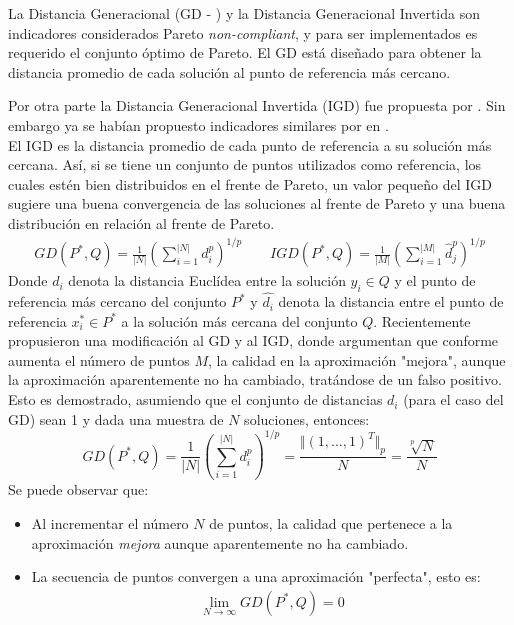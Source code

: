 La Distancia Generacional (GD - \cite{Joel:GD}) y la Distancia Generacional Invertida  son indicadores considerados Pareto \textit{non-compliant}, y para ser implementados es requerido el conjunto óptimo de Pareto.
%
El GD está diseñado para obtener la distancia promedio de cada solución al punto de referencia más cercano. 


Por otra parte la Distancia Generacional Invertida (IGD) fue propuesta por \cite{Joel:ParallelizationMOEA, Joel:SwarmOptimizerDiversity}. Sin embargo ya se habían propuesto indicadores similares por \citeauthor{Joel:SimulatedAnnealingMetaheuristic} en \citeyear{Joel:SimulatedAnnealingMetaheuristic}.\\
%
El IGD es la distancia promedio de cada punto de referencia a su solución más cercana.
%
Así, si se tiene un conjunto de puntos utilizados como referencia, los cuales estén bien distribuidos en el frente de Pareto, un valor pequeño del IGD sugiere una buena convergencia de las soluciones al frente de Pareto y una buena distribución en relación al frente de Pareto.
\begin{equation}
\begin{split}
GD (P^*, Q) = \frac{1}{|N|}\left(  \sum_{i=1}^{|N|} d_i^p  \right) ^{1/p} \qquad
IGD (P^*, Q) = \frac{1}{|M|}\left(  \sum_{i=1}^{|M|} \hat{d}_j^p  \right) ^{1/p}
\end{split}
\end{equation}
Donde $d_i$ denota la distancia Euclídea entre la solución $y_i \in Q$ y el punto de referencia más cercano del conjunto $P^*$ y $\hat{d_i}$ denota la distancia entre el punto de referencia $x_i^* \in P^*$ a la solución más cercana del conjunto $Q$. 
% 
Recientemente \citeauthor{Joel:HausdorffDistance} propusieron una modificación al GD y al IGD, donde argumentan que conforme aumenta el número de puntos $M$, la calidad en la aproximación "mejora", aunque la aproximación aparentemente no ha cambiado, tratándose de un falso positivo.
%
Esto es demostrado, asumiendo que el conjunto de distancias $d_i$ (para el caso del GD) sean 1 y dada una muestra de $N$ soluciones, entonces:
\begin{equation*}
  GD(P^*, Q) = \frac{1}{|N|}\left( \sum_{i=1}^{|N|} d_i^p  \right) ^{1/p} = \frac{ \Vert (1,...,1)^T \Vert_p }{N} = \frac{\sqrt[p]{N}}{N} 
\end{equation*}
%
Se puede observar que:
\begin{itemize}
\item Al incrementar el número $N$ de puntos, la calidad que pertenece a la aproximación \textit{mejora} aunque aparentemente no ha cambiado.
\item La secuencia de puntos convergen a una aproximación "perfecta", esto es:
\begin{equation*}
\begin{split}
  \lim_{N \to \infty} GD( P^*, Q) = 0 
\end{split}
\end{equation*}
\end{itemize}
